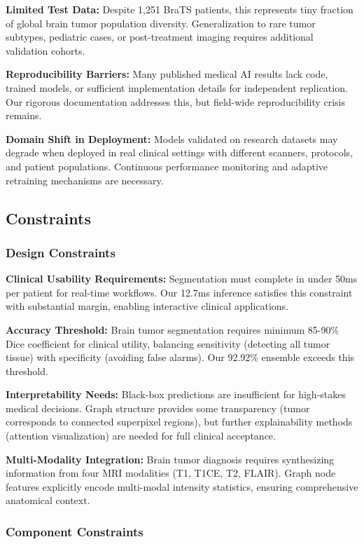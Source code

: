 \textbf{Limited Test Data:} Despite 1,251 BraTS patients, this represents tiny fraction of global brain tumor population diversity. Generalization to rare tumor subtypes, pediatric cases, or post-treatment imaging requires additional validation cohorts.

\textbf{Reproducibility Barriers:} Many published medical AI results lack code, trained models, or sufficient implementation details for independent replication. Our rigorous documentation addresses this, but field-wide reproducibility crisis remains.

\textbf{Domain Shift in Deployment:} Models validated on research datasets may degrade when deployed in real clinical settings with different scanners, protocols, and patient populations. Continuous performance monitoring and adaptive retraining mechanisms are necessary.


\subsection{Constraints}

\subsubsection{Design Constraints}

\textbf{Clinical Usability Requirements:} Segmentation must complete in under 50ms per patient for real-time workflows. Our 12.7ms inference satisfies this constraint with substantial margin, enabling interactive clinical applications.

\textbf{Accuracy Threshold:} Brain tumor segmentation requires minimum 85-90\% Dice coefficient for clinical utility, balancing sensitivity (detecting all tumor tissue) with specificity (avoiding false alarms). Our 92.92\% ensemble exceeds this threshold.

\textbf{Interpretability Needs:} Black-box predictions are insufficient for high-stakes medical decisions. Graph structure provides some transparency (tumor corresponds to connected superpixel regions), but further explainability methods (attention visualization) are needed for full clinical acceptance.

\textbf{Multi-Modality Integration:} Brain tumor diagnosis requires synthesizing information from four MRI modalities (T1, T1CE, T2, FLAIR). Graph node features explicitly encode multi-modal intensity statistics, ensuring comprehensive anatomical context.

\subsubsection{Component Constraints}

